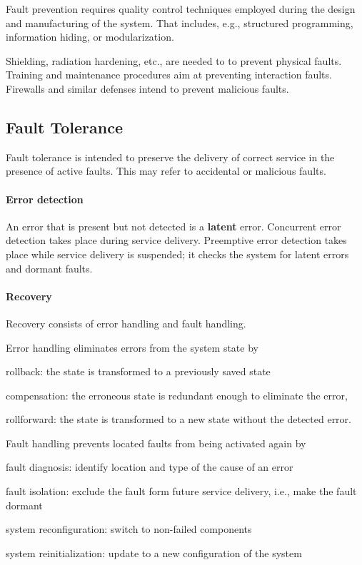 Fault prevention requires quality control techniques employed during the design and manufacturing of the system.
That includes, e.g., structured programming, information hiding, or modularization.

Shielding, radiation hardening, etc., are needed to to prevent physical faults.
Training and maintenance procedures aim at preventing interaction faults.
Firewalls and similar defenses intend to prevent malicious faults.

\subsection{Fault Tolerance}

Fault tolerance is intended to preserve the delivery of correct service in the presence of active faults.
This may refer to accidental or malicious faults.

\paragraph{Error detection}
An error that is present but not detected is a \textbf{latent} error. 
Concurrent error detection takes place during service delivery.
Preemptive error detection takes place while service delivery is suspended; it checks the
system for latent errors and dormant faults.

\paragraph{Recovery}
Recovery consists of error handling and fault handling.

Error handling eliminates errors from the system state by
\begin{compactitem}
  \item rollback: the state is transformed to a previously saved state
  \item compensation: the erroneous state is redundant enough to eliminate the error,
  \item rollforward: the state is transformed to a new state without the detected error.
\end{compactitem}

Fault handling prevents located faults from being activated again by
\begin{compactitem}
  \item fault diagnosis: identify location and type of the cause of an error
  \item fault isolation: exclude the fault form future service delivery, i.e., make the fault dormant
  \item system reconfiguration: switch to non-failed components
  \item system reinitialization: update to a new configuration of the system
\end{compactitem}

